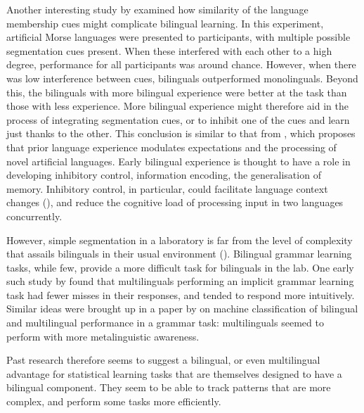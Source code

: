 Another interesting study by \textcite{Bartolotti2011} examined how similarity of the language membership cues might complicate bilingual learning. In this experiment, artificial Morse languages were presented to participants, with multiple possible segmentation cues present. When these interfered with each other to a high degree, performance for all participants was around chance. However, when there was low interference between cues, bilinguals outperformed monolinguals. Beyond this, the bilinguals with more bilingual experience were better at the task than those with less experience. More bilingual experience might therefore aid in the process of integrating segmentation cues, or to inhibit one of the cues and learn just thanks to the other. This conclusion is similar to that from \textcite{Weiss2020}, which proposes that prior language experience modulates expectations and the processing of novel artificial languages. Early bilingual experience is thought to have a role in developing inhibitory control, information encoding, the generalisation of memory. Inhibitory control, in particular, could facilitate language context changes (\cite{Antovich2018}), and reduce the cognitive load of processing input in two languages concurrently.

However, simple segmentation in a laboratory is far from the level of complexity that assails bilinguals in their usual environment (\cite{Frost2019}). Bilingual grammar learning tasks, while few, provide a more difficult task for bilinguals in the lab. One early such study by \textcite{Nation1986} found that multilinguals performing an implicit grammar learning task had fewer misses in their responses, and tended to respond more intuitively. Similar ideas were brought up in a paper by \textcite{Roncaglia2022} on machine classification of bilingual and multilingual performance in a grammar task: multilinguals seemed to perform with more metalinguistic awareness.

Past research therefore seems to suggest a bilingual, or even multilingual advantage for statistical learning tasks that are themselves designed to have a bilingual component. They seem to be able to track patterns that are more complex, and perform some tasks more efficiently.


